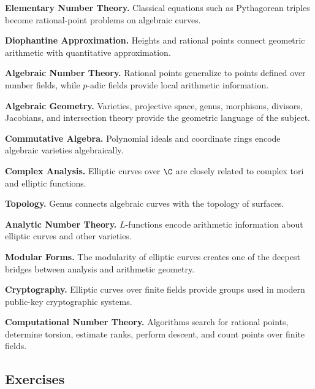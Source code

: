 \begin{applicationbox}
\textbf{Elementary Number Theory.}
Classical equations such as Pythagorean triples become rational-point
problems on algebraic curves.

\medskip

\textbf{Diophantine Approximation.}
Heights and rational points connect geometric arithmetic with quantitative
approximation.

\medskip

\textbf{Algebraic Number Theory.}
Rational points generalize to points defined over number fields, while
\(p\)-adic fields provide local arithmetic information.

\medskip

\textbf{Algebraic Geometry.}
Varieties, projective space, genus, morphisms, divisors, Jacobians, and
intersection theory provide the geometric language of the subject.

\medskip

\textbf{Commutative Algebra.}
Polynomial ideals and coordinate rings encode algebraic varieties
algebraically.

\medskip

\textbf{Complex Analysis.}
Elliptic curves over \(\C\) are closely related to complex tori and elliptic
functions.

\medskip

\textbf{Topology.}
Genus connects algebraic curves with the topology of surfaces.

\medskip

\textbf{Analytic Number Theory.}
\(L\)-functions encode arithmetic information about elliptic curves and other
varieties.

\medskip

\textbf{Modular Forms.}
The modularity of elliptic curves creates one of the deepest bridges between
analysis and arithmetic geometry.

\medskip

\textbf{Cryptography.}
Elliptic curves over finite fields provide groups used in modern public-key
cryptographic systems.

\medskip

\textbf{Computational Number Theory.}
Algorithms search for rational points, determine torsion, estimate ranks,
perform descent, and count points over finite fields.
\end{applicationbox}

\subsection{Exercises}
\label{subsec:diophantine-geometry-exercises}

